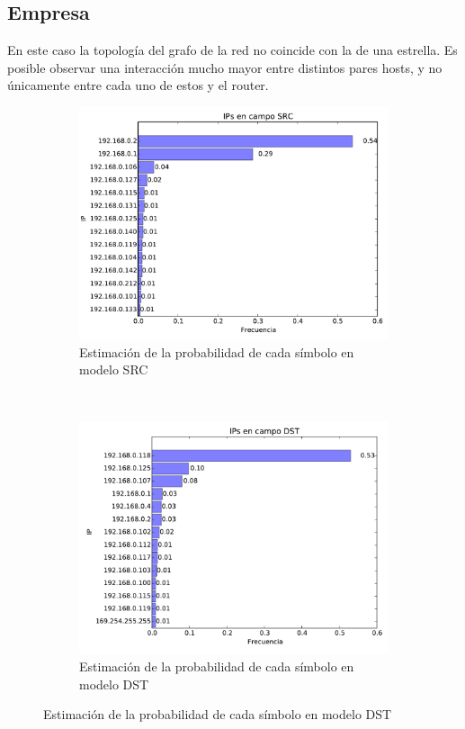 \FloatBarrier

\subsection{Empresa}


En este caso la topología del grafo de la red no coincide con la de una estrella. Es posible observar una interacción mucho mayor entre distintos pares hosts, y no únicamente
entre cada uno de estos y el router.

\begin{figure}[H]
	\center
	\begin{subfigure}{0.4\textwidth}
		\includegraphics[width=1.0\textwidth]{resultados/empresa/ipsSrc_2_05542931604.pdf}
		\caption{Estimaci\'on de la probabilidad de cada s\'imbolo en modelo SRC}
	\end{subfigure}
	~
	\begin{subfigure}{0.4\textwidth}
		\includegraphics[width=1.0\textwidth]{resultados/empresa/ipsDst_2_99926622579.pdf}
		\caption{Estimaci\'on de la probabilidad de cada s\'imbolo en modelo DST}
	\end{subfigure}
\end{figure}

